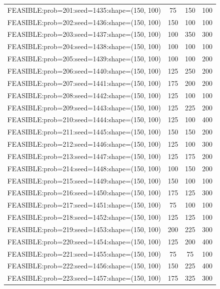 \begin{longtable}{lccc}
FEASIBLE:prob=201:seed=1435:shape=(150, 100) &       75 &   150 &    100 \\
FEASIBLE:prob=202:seed=1436:shape=(150, 100) &      150 &   100 &    100 \\
FEASIBLE:prob=203:seed=1437:shape=(150, 100) &      100 &   350 &    300 \\
FEASIBLE:prob=204:seed=1438:shape=(150, 100) &      100 &   100 &    100 \\
FEASIBLE:prob=205:seed=1439:shape=(150, 100) &      100 &   100 &    200 \\
FEASIBLE:prob=206:seed=1440:shape=(150, 100) &      125 &   250 &    200 \\
FEASIBLE:prob=207:seed=1441:shape=(150, 100) &      175 &   200 &    200 \\
FEASIBLE:prob=208:seed=1442:shape=(150, 100) &      125 &   100 &    100 \\
FEASIBLE:prob=209:seed=1443:shape=(150, 100) &      125 &   225 &    200 \\
FEASIBLE:prob=210:seed=1444:shape=(150, 100) &      125 &   100 &    400 \\
FEASIBLE:prob=211:seed=1445:shape=(150, 100) &      150 &   150 &    200 \\
FEASIBLE:prob=212:seed=1446:shape=(150, 100) &      125 &   100 &    300 \\
FEASIBLE:prob=213:seed=1447:shape=(150, 100) &      125 &   175 &    200 \\
FEASIBLE:prob=214:seed=1448:shape=(150, 100) &      100 &   150 &    200 \\
FEASIBLE:prob=215:seed=1449:shape=(150, 100) &      150 &   100 &    100 \\
FEASIBLE:prob=216:seed=1450:shape=(150, 100) &      175 &   125 &    300 \\
FEASIBLE:prob=217:seed=1451:shape=(150, 100) &       75 &   100 &    100 \\
FEASIBLE:prob=218:seed=1452:shape=(150, 100) &      125 &   125 &    100 \\
FEASIBLE:prob=219:seed=1453:shape=(150, 100) &      200 &   225 &    300 \\
FEASIBLE:prob=220:seed=1454:shape=(150, 100) &      125 &   200 &    400 \\
FEASIBLE:prob=221:seed=1455:shape=(150, 100) &       75 &    75 &    100 \\
FEASIBLE:prob=222:seed=1456:shape=(150, 100) &      150 &   225 &    400 \\
FEASIBLE:prob=223:seed=1457:shape=(150, 100) &      175 &   325 &    300 \\

\end{longtable}
